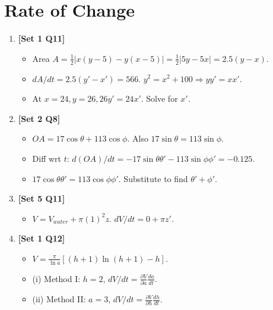 \documentclass[12pt, a4paper]{article} %
\begin{document}
\section{Rate of Change}
\begin{enumerate}
    \item \textbf{[Set 1 Q11]}
    \begin{itemize}
        \item Area $A = \frac{1}{2} |x(y-5) - y(x-5)| = \frac{1}{2} |5y - 5x| = 2.5(y-x)$.
        \item $dA/dt = 2.5(y' - x') = 566$. $y^2 = x^2+100 \Rightarrow yy' = xx'$.
        \item At $x=24, y=26, 26y' = 24x'$. Solve for $x'$.
    \end{itemize}

    \item \textbf{[Set 2 Q8]}
    \begin{itemize}
        \item $OA = 17\cos\theta + 113\cos\phi$. Also $17\sin\theta = 113\sin\phi$.
        \item Diff wrt $t$: $d(OA)/dt = -17\sin\theta \theta' - 113\sin\phi \phi' = -0.125$.
        \item $17\cos\theta \theta' = 113\cos\phi \phi'$. Substitute to find $\theta' + \phi'$.
    \end{itemize}

    \item \textbf{[Set 5 Q11]}
    \begin{itemize}
        \item $V = V_{water} + \pi(1)^2 z$. $dV/dt = 0 + \pi z'$.
    \end{itemize}

    \item \textbf{[Set 1 Q12]}
    \begin{itemize}
        \item $V = \frac{\pi}{\ln a} [(h+1)\ln(h+1) - h]$.
        \item (i) Method I: $h=2$, $dV/dt = \frac{\partial V}{\partial a} \frac{da}{dt}$.
        \item (ii) Method II: $a=3$, $dV/dt = \frac{\partial V}{\partial h} \frac{dh}{dt}$.
    \end{itemize}
\end{enumerate}
\end{document}
